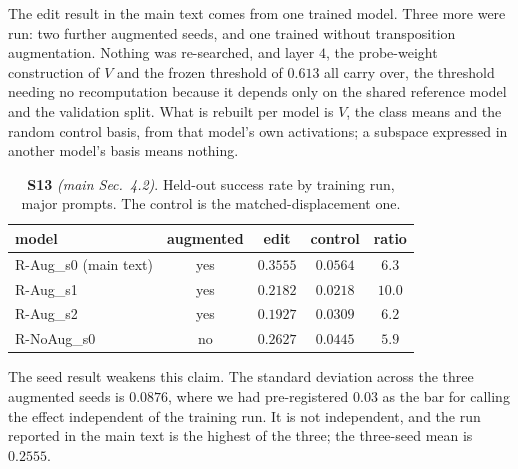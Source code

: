 \documentclass{article}
\begin{document}
The edit result in the main text comes from one trained model. Three more were run:
two further augmented seeds, and one trained without transposition augmentation.
Nothing was re-searched, and layer $4$, the probe-weight construction of $V$ and the
frozen threshold of $0.613$ all carry over, the threshold needing no recomputation because
it depends only on the shared reference model and the validation split. What is
rebuilt per model is $V$, the class means and the random control basis, from that
model's own activations; a subspace expressed in another model's basis means nothing.

\begin{table}[!t]
\centering
\caption{\textbf{S13} \textit{(main Sec.~4.2)}. Held-out success rate by training run,
major prompts. The control is the matched-displacement one.}
\label{tab:supp-seeds}
\footnotesize
\begin{tabular}{@{}lcccc@{}}
\toprule
model & augmented & edit & control & ratio\\
\midrule
R-Aug\_s0 (main text) & yes & $0.3555$ & $0.0564$ & $6.3$\\
R-Aug\_s1             & yes & $0.2182$ & $0.0218$ & $10.0$\\
R-Aug\_s2             & yes & $0.1927$ & $0.0309$ & $6.2$\\
R-NoAug\_s0           & no  & $0.2627$ & $0.0445$ & $5.9$\\
\bottomrule
\end{tabular}
\end{table}

The seed result weakens this claim. The standard deviation across
the three augmented seeds is $0.0876$, where we had pre-registered $0.03$ as the bar
for calling the effect independent of the training run. It is not independent, and the
run reported in the main text is the highest of the three; the three-seed mean is
$0.2555$.
\end{document}
